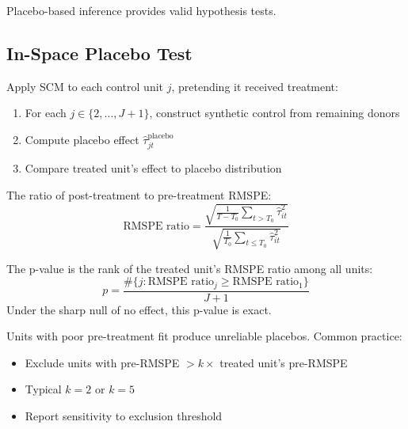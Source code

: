 Placebo-based inference provides valid hypothesis tests.

\subsection{In-Space Placebo Test}

\begin{definition}
\label{def:placebo_space}
Apply SCM to each control unit $j$, pretending it received treatment:
\begin{enumerate}
    \item For each $j \in \{2, \ldots, J+1\}$, construct synthetic control from remaining donors
    \item Compute placebo effect $\hat{\tau}_{jt}^{\text{placebo}}$
    \item Compare treated unit's effect to placebo distribution
\end{enumerate}
\end{definition}

\begin{definition}
The ratio of post-treatment to pre-treatment RMSPE:
\begin{equation}
    \text{RMSPE ratio} = \frac{\sqrt{\frac{1}{T - T_0} \sum_{t>T_0} \hat{\tau}_{it}^2}}{\sqrt{\frac{1}{T_0} \sum_{t \leq T_0} \hat{\tau}_{it}^2}}
\end{equation}
\end{definition}

\begin{proposition}
\label{prop:placebo_pvalue}
The p-value is the rank of the treated unit's RMSPE ratio among all units:
\begin{equation}
    p = \frac{\#\{j : \text{RMSPE ratio}_j \geq \text{RMSPE ratio}_1\}}{J + 1}
\end{equation}
Under the sharp null of no effect, this p-value is exact.
\end{proposition}

\begin{remark}
Units with poor pre-treatment fit produce unreliable placebos. Common practice:
\begin{itemize}
    \item Exclude units with pre-RMSPE $> k \times$ treated unit's pre-RMSPE
    \item Typical $k = 2$ or $k = 5$
    \item Report sensitivity to exclusion threshold
\end{itemize}
\end{remark}

